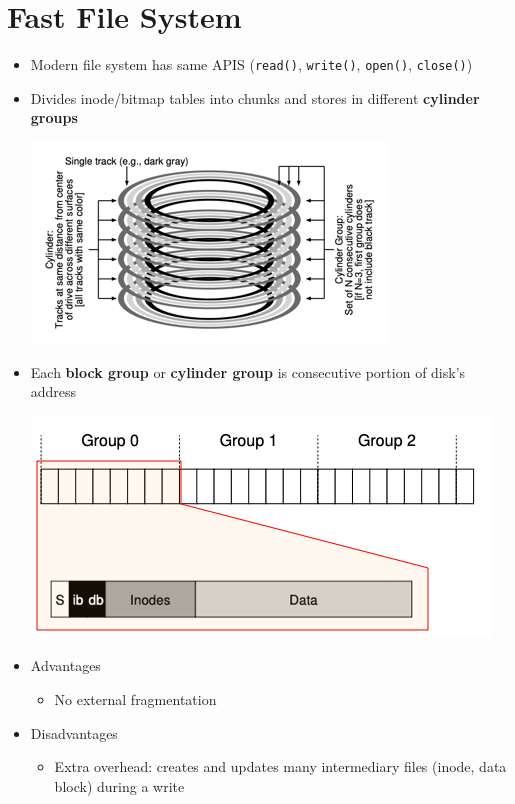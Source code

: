 \documentclass[12pt]{article}
\begin{document}
\section{Fast File System}

\begin{itemize}
    \item Modern file system has same APIS (\texttt{read()}, \texttt{write()}, \texttt{open()}, \texttt{close()})
    \item Divides inode/bitmap tables into chunks and stores in different \textbf{cylinder groups}

    \begin{center}
    \includegraphics[width=0.8\linewidth]{../images/midterm_2_solution_28.png}
    \end{center}
    \item Each \textbf{block group} or \textbf{cylinder group} is consecutive
    portion of disk's address

    \begin{center}
    \includegraphics[width=0.8\linewidth]{../images/midterm_2_solution_29.png}
    \end{center}
    \item Advantages
    \begin{itemize}
        \item No external fragmentation
    \end{itemize}
    \item Disadvantages
    \begin{itemize}
        \item Extra overhead: creates and updates many intermediary files (inode, data block) during a write
    \end{itemize}
\end{itemize}
\end{document}

